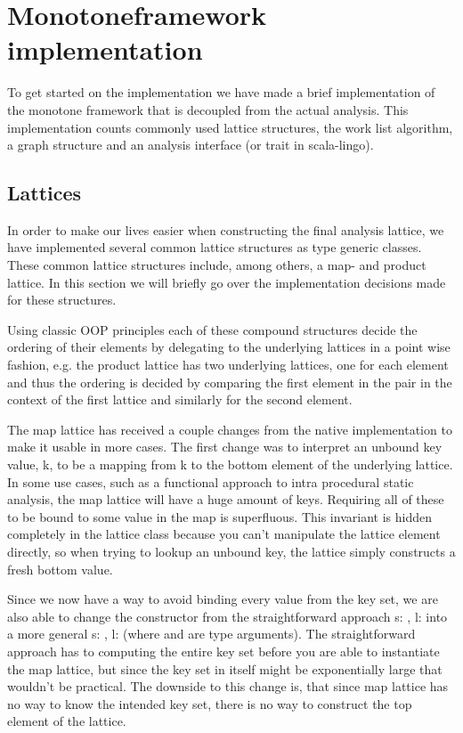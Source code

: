 \chapter{Monotoneframework implementation}

To get started on the implementation we have made a brief implementation of the monotone framework that is decoupled from the actual analysis.
This implementation counts commonly used lattice structures, the work list algorithm, a graph structure and an analysis interface (or trait in scala-lingo).

\section{Lattices}

In order to make our lives easier when constructing the final analysis lattice, we have implemented several common lattice structures as type generic classes. 
These common lattice structures include, among others, a map- and product lattice. 
In this section we will briefly go over the implementation decisions made for these structures.

Using classic OOP principles each of these compound structures decide the ordering of their elements by delegating to the underlying lattices in a point wise fashion, 
e.g. the product lattice has two underlying lattices, 
one for each element and thus the ordering is decided by comparing the first element in the pair in the context of the first lattice and similarly for the second element.

The map lattice has received a couple changes from the native implementation to make it usable in more cases. 
The first change was to interpret an unbound key value, k, to be a mapping from k to the bottom element of the underlying lattice. 
In some use cases, such as a functional approach to intra procedural static analysis, the map lattice will have a huge amount of keys. 
Requiring all of these to be bound to some value in the map is superfluous. 
This invariant is hidden completely in the lattice class because you can't manipulate the lattice element directly, 
so when trying to lookup an unbound key, the lattice simply constructs a fresh bottom value.

Since we now have a way to avoid binding every value from the key set, we are also able to change the constructor 
from the straightforward approach s: , l:  into a more general s: , l:  
(where  and  are type arguments). The straightforward approach has to computing the entire key set before you are able to 
instantiate the map lattice, but since the key set in itself might be exponentially large that wouldn't be practical. The downside to this change is, 
that since map lattice has no way to know the intended key set, there is no way to construct the top element of the lattice.

